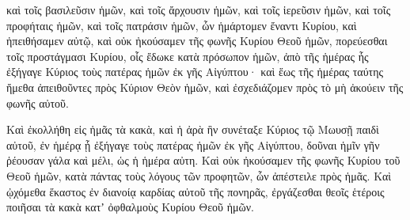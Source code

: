 {καὶ τοῖς βασιλεῦσιν ἡμῶν, καὶ τοῖς ἄρχουσιν ἡμῶν, καὶ τοῖς ἱερεῦσιν ἡμῶν, καὶ τοῖς προφήταις ἡμῶν, καὶ τοῖς πατράσιν ἡμῶν,
ὧν ἡμάρτομεν ἔναντι Κυρίου,
καὶ ἠπειθήσαμεν αὐτῷ, καὶ οὐκ ἠκούσαμεν τῆς φωνῆς Κυρίου Θεοῦ ἡμῶν, πορεύεσθαι τοῖς προστάγμασι Κυρίου, οἷς ἔδωκε κατὰ πρόσωπον ἡμῶν,
ἀπὸ τῆς ἡμέρας ἧς ἐξήγαγε Κύριος τοὺς πατέρας ἡμῶν ἐκ γῆς Αἰγύπτου· καὶ ἕως τῆς ἡμέρας ταύτης ἤμεθα ἀπειθοῦντες πρὸς Κύριον Θεὸν ἡμῶν, καὶ ἐσχεδιάζομεν πρὸς τὸ μὴ ἀκούειν τῆς φωνῆς αὐτοῦ.
\par }{\PP {}Καὶ ἐκολλήθη εἰς ἡμᾶς τὰ κακὰ, καὶ ἡ ἀρὰ ἣν συνέταξε Κύριος τῷ Μωυσῇ παιδὶ αὐτοῦ, ἐν ἡμέρᾳ ᾗ ἐξήγαγε τοὺς πατέρας ἡμῶν ἐκ γῆς Αἰγύπτου, δοῦναι ἡμῖν γῆν ῥέουσαν γάλα καὶ μέλι, ὡς ἡ ἡμέρα αὐτη.
Καὶ οὐκ ἠκούσαμεν τῆς φωνῆς Κυρίου τοῦ Θεοῦ ἡμῶν, κατὰ πάντας τοὺς λόγους τῶν προφητῶν, ὧν ἀπέστειλε πρὸς ἡμᾶς.
Καὶ ᾠχόμεθα ἕκαστος ἐν διανοίᾳ καρδίας αὐτοῦ τῆς πονηρᾶς, ἐργάζεσθαι θεοῖς ἑτέροις ποιῆσαι τὰ κακὰ κατʼ ὀφθαλμοὺς Κυρίου Θεοῦ ἡμῶν.

}
